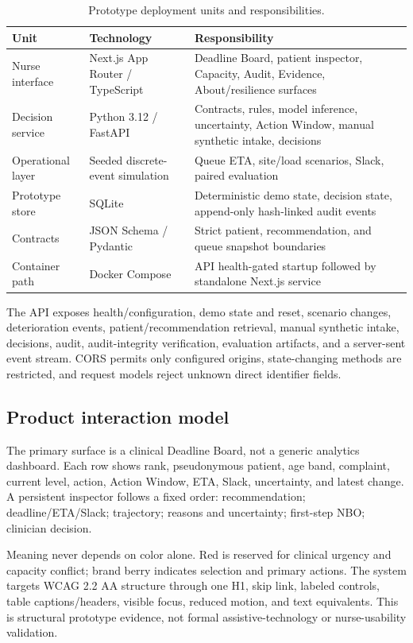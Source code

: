 \documentclass[11pt,a4paper]{article}
\begin{document}
\begin{table}[H]
\centering
\caption{Prototype deployment units and responsibilities.}
\begin{tabularx}{\textwidth}{@{}L{35mm}L{50mm}Y@{}}
\toprule
Unit & Technology & Responsibility \\
\midrule
Nurse interface & Next.js App Router / TypeScript & Deadline Board, patient inspector, Capacity, Audit, Evidence, About/resilience surfaces \\
Decision service & Python 3.12 / FastAPI & Contracts, rules, model inference, uncertainty, Action Window, manual synthetic intake, decisions \\
Operational layer & Seeded discrete-event simulation & Queue ETA, site/load scenarios, Slack, paired evaluation \\
Prototype store & SQLite & Deterministic demo state, decision state, append-only hash-linked audit events \\
Contracts & JSON Schema / Pydantic & Strict patient, recommendation, and queue snapshot boundaries \\
Container path & Docker Compose & API health-gated startup followed by standalone Next.js service \\
\bottomrule
\end{tabularx}
\end{table}

The API exposes health/configuration, demo state and reset, scenario changes, deterioration events, patient/recommendation retrieval, manual synthetic intake, decisions, audit, audit-integrity verification, evaluation artifacts, and a server-sent event stream. CORS permits only configured origins, state-changing methods are restricted, and request models reject unknown direct identifier fields.

\subsection{Product interaction model}

The primary surface is a clinical Deadline Board, not a generic analytics dashboard. Each row shows rank, pseudonymous patient, age band, complaint, current level, action, Action Window, ETA, Slack, uncertainty, and latest change. A persistent inspector follows a fixed order: recommendation; deadline/ETA/Slack; trajectory; reasons and uncertainty; first-step NBO; clinician decision.

Meaning never depends on color alone. Red is reserved for clinical urgency and capacity conflict; brand berry indicates selection and primary actions. The system targets WCAG 2.2 AA structure through one H1, skip link, labeled controls, table captions/headers, visible focus, reduced motion, and text equivalents. This is structural prototype evidence, not formal assistive-technology or nurse-usability validation.
\end{document}
